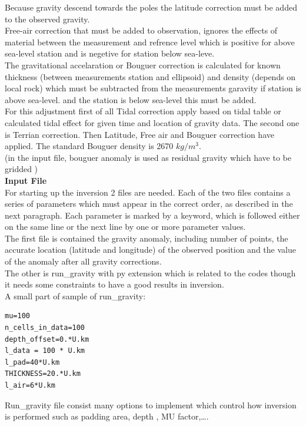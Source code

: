 Because gravity descend towards the poles the latitude correction must be added to the observed gravity.\\
Free-air correction that must be added to observation, ignores the effects of material between the measurement and refrence level which is positive for above sea-level station and is negetive for station below sea-leve.\\
The gravitational accelaration or Bouguer correction is calculated for known thickness (between measurements station and ellipsoid) and density (depends on local rock) which must be subtracted from the measurements garavity if station is above sea-level. and the station is below sea-level this must be added.\\
For this adjustment first of all Tidal correction apply based on tidal table or calculated tidal effect for given time and location of gravity data. The second one is Terrian correction. Then Latitude, Free air and Bouguer correction have applied. The standard Bouguer density is 2670 $kg/m^3$.\\

(in the input file, bouguer anomaly is used as residual gravity  which have to be gridded )\\

\textbf{Input File} \\

For starting up the inversion 2 files are needed. Each of the two files contains a series of parameters which must appear in the correct order, as described in the next paragraph. Each parameter is marked by a keyword, which is followed either on the same line or the next line by one or more parameter values. \\
The first file is contained the gravity anomaly, including number of points, the accurate location (latitude and longitude) of the observed position and the value of the anomaly after all gravity corrections.\\
The other is run_gravity with py extension which is related to the codes though it needs some constraints to have a good results in inversion.\\

A small part of sample of run_gravity:\\
\begin{verbatim}
mu=100
n_cells_in_data=100
depth_offset=0.*U.km
l_data = 100 * U.km
l_pad=40*U.km
THICKNESS=20.*U.km
l_air=6*U.km
\end{verbatim}

Run_gravity file consist many options to implement which control how inversion is performed such as padding area, depth , MU factor,\ldots.

